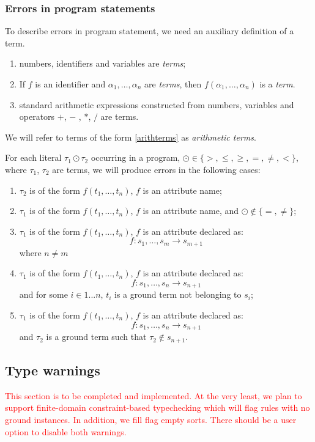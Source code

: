 \documentclass[12pt, letterpaper]{article}
\begin{document}
\subsubsection{Errors in program statements}

To describe errors in program statement, we need an auxiliary definition of a term.
\begin{enumerate}
 \item numbers, identifiers and variables are \textit{terms};
 \item If $f$ is an identifier and $\alpha_1, \dots, \alpha_n$ are \textit{terms}, 
   then $f(\alpha_1,\dots, \alpha_n)$ is a \textit{term}.
 \item\label{arithterms} standard arithmetic expressions constructed from numbers, variables and operators $+$, $-$ , $*$, $/$ are terms. 
\end{enumerate}

\medskip\noindent
We will refer to terms of the form \ref{arithterms} as \textit{arithmetic terms}.

\medskip\noindent
For each literal $\tau_1 \odot \tau_2$ occurring in a program,  $\odot \in \{>, \leq, \geq, =, \not=, <\}$, where $\tau_1$, $\tau_2$ are terms, we will produce errors in the following cases:

\begin{enumerate}
  
\item $\tau_2$ is of the form $f(t_1,\ldots,t_n)$, $f$ is an attribute name;
\item $\tau_1$ is of the form $f(t_1,\ldots,t_n)$, $f$ is an attribute name, and $\odot \not\in\{=,\not=\}$;
\item $\tau_1$ is of the form $f(t_1,\ldots,t_n)$, $f$ is an attribute declared as:
  $$f: s_1,\ldots,s_m \rightarrow s_{m+1}$$
  where $n \not=m$
  
\item $\tau_1$ is of the form $f(t_1,\ldots,t_n)$, $f$ is an attribute declared as:
  $$f: s_1,\ldots,s_n \rightarrow s_{n+1}$$
  and for some $i \in 1...n$, $t_i$ is a ground term not belonging to $s_i$;
  
\item $\tau_1$ is of the form $f(t_1,\ldots,t_n)$, $f$ is an attribute declared as:
  $$f: s_1,\ldots,s_n \rightarrow s_{n+1}$$
  and $\tau_2$ is a ground term such that $\tau_2 \not\in s_{n+1}$.
  
\end{enumerate}


\subsection{Type warnings}\label{type_warnings}

\textcolor{red}{This section is to be completed and implemented. At the very least, we plan to support
  finite-domain constraint-based typechecking which will flag rules with no ground instances. In addition, we fill flag empty sorts. There should be a user option to disable both warnings.}



\end{document}
